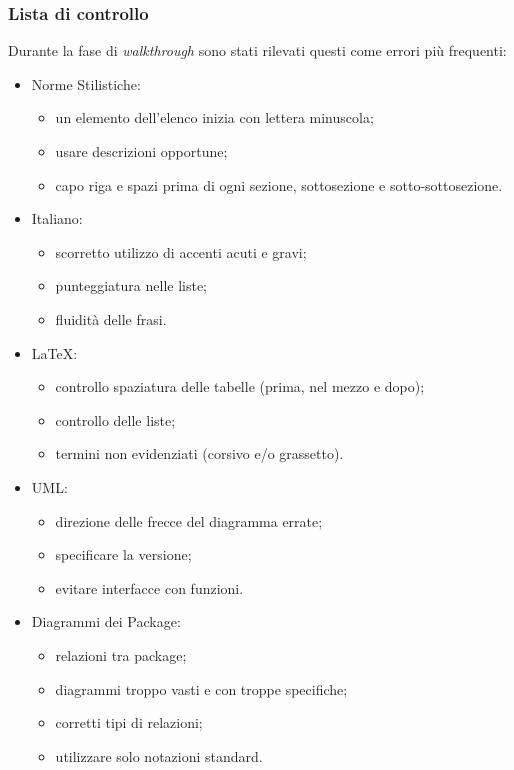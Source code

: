 \documentclass[12pt,a4paper,titlepage]{article}
\begin{document}
\subsubsection{Lista di controllo}	%
Durante la fase di \textit{walkthrough} sono stati rilevati questi come errori più frequenti:
\begin{itemize}
\item Norme Stilistiche:
	\begin{itemize}
		\item un elemento dell'elenco inizia con lettera minuscola;
		\item usare descrizioni opportune;
		\item capo riga e spazi prima di ogni sezione, sottosezione e sotto-sottosezione.
	\end{itemize}
\item Italiano:
	\begin{itemize}
		\item scorretto utilizzo di accenti acuti e gravi;
		\item punteggiatura nelle liste;
		\item fluidità delle frasi.
	\end{itemize}
\item \LaTeX:
	\begin{itemize}
		\item controllo spaziatura delle tabelle (prima, nel mezzo e dopo);
		\item controllo delle liste;
		\item termini non evidenziati (corsivo e/o grassetto).
	\end{itemize}
\item UML:
	\begin{itemize}
		\item direzione delle frecce del diagramma errate;
		\item specificare la versione;
		\item evitare interfacce con funzioni.
	\end{itemize}
\item Diagrammi dei Package:	
	\begin{itemize}
		\item relazioni tra package;
		\item diagrammi troppo vasti e con troppe specifiche;
		\item corretti tipi di relazioni;
		\item utilizzare solo notazioni standard.
	\end{itemize}

\end{itemize}
\end{document}
